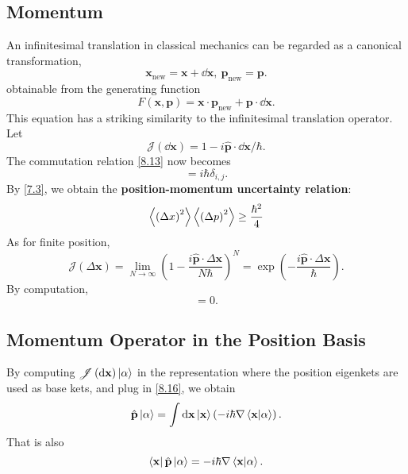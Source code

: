 \documentclass{article}
\theoremstyle{1}
\begin{document}
\subsection{Momentum}
An infinitesimal translation in classical mechanics can be regarded as a canonical transformation,
\begin{equation}
    \mathbf{x}_{\text{new}}=\mathbf{x}+\dd{\mathbf{x}},\ \mathbf{p}_{\text{new}}=\mathbf{p}.
\end{equation}
obtainable from the generating function
\begin{equation}
    F(\mathbf{x},\mathbf{p})=\mathbf{x}\cdot\mathbf{p}_{\text{new}}+\mathbf{p}\cdot\dd{\mathbf{x}}.
\end{equation}
This equation has a striking similarity to the infinitesimal translation operator. Let 
\begin{equation}\label{8.16}
    \mathscr{J}(\dd{\mathbf{x}})=1-i\hat{\mathbf{p}}\cdot\dd{\mathbf{x}}/\hbar. 
\end{equation}
The commutation relation \eqref{8.13} now becomes
\begin{equation}
    [\hat{x}_i,\hat{p}_j]=i\hbar\delta_{i,j}.
\end{equation}
By \eqref{7.3}, we obtain the \textbf{position-momentum uncertainty relation}:
\begin{equation}
    \expval{\left(\Delta x\right)^2}\expval{\left(\Delta p\right)^2}\ge\frac{\hbar^2}{4}
\end{equation}
As for finite position\label{dispalcement operator}, 
\begin{equation}
    \mathscr{J}(\Delta \mathbf{x})=\lim_{N\rightarrow \infty}\left(1-\frac{i\hat{\mathbf{p}}\cdot\Delta\mathbf{x}}{N\hbar}\right)^N=\exp\left(-\frac{i\hat{\mathbf{p}}\cdot\Delta \mathbf{x}}{\hbar}\right).
\end{equation}
By computation,
\begin{equation}
    [\hat{p}_i,\hat{p}_j]=0.
\end{equation}
\subsection{Momentum Operator in the Position Basis}
By computing $\mathscr{J}\left(\dd{\mathbf{x}}\right)\ket{\alpha}$ in
the representation where the position eigenkets are used as base kets, and plug in \eqref{8.16}, we obtain 
\begin{equation}
    \hat{\mathbf{p}}\ket{\alpha}=\int \dd{\mathbf{x}}\ket{\mathbf{x}}\left(-i\hbar\nabla\bra{\mathbf{x}}\ket{\alpha}\right).
\end{equation}
That is also 
\begin{equation}\label{8.23}
    \bra{\mathbf{x}}\hat{\mathbf{p}}\ket{\alpha}=-i\hbar\nabla\braket{\mathbf{x}}{\alpha}.
\end{equation}
\end{document}
